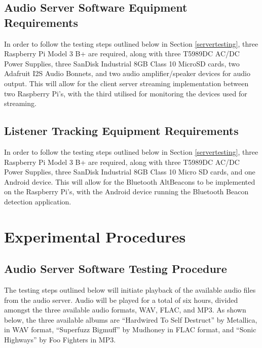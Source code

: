 \documentclass[11pt,a4paper,headinclude=false,footinclude=false]{scrreprt}
\begin{document}
\subsection{Audio Server Software Equipment
Requirements}\label{audio-server-software-equipment-requirements}

In order to follow the testing steps outlined below in Section
\ref{servertesting}, three Raspberry Pi Model 3 B+ are required, along
with three T5989DC AC/DC Power Supplies, three SanDisk Industrial 8GB
Class 10 MicroSD cards, two Adafruit I2S Audio Bonnets, and two audio
amplifier/speaker devices for audio output. This will allow for the
client server streaming implementation between two Raspberry Pi's, with
the third utilised for monitoring the devices used for streaming.

\subsection{Listener Tracking Equipment
Requirements}\label{listener-tracking-equipment-requirements}

In order to follow the testing steps outlined below in Section
\ref{servertesting}, three Raspberry Pi Model 3 B+ are required, along
with three T5989DC AC/DC Power Supplies, three SanDisk Industrial 8GB
Class 10 Micro SD cards, and one Android device. This will allow for the
Bluetooth AltBeacons to be implemented on the Raspberry Pi's, with the
Android device running the Bluetooth Beacon detection application.

\section{\texorpdfstring{Experimental Procedures
\label{expprocedure}}{Experimental Procedures }}\label{experimental-procedures}

\subsection{\texorpdfstring{Audio Server Software Testing Procedure
\label{servertesting}}{Audio Server Software Testing Procedure }}\label{audio-server-software-testing-procedure}

The testing steps outlined below will initiate playback of the available
audio files from the audio server. Audio will be played for a total of
six hours, divided amongst the three available audio formats, WAV, FLAC,
and MP3. As shown below, the three available albums are ``Hardwired To
Self Destruct'' by Metallica, in WAV format, ``Superfuzz Bigmuff'' by
Mudhoney in FLAC format, and ``Sonic Highways'' by Foo Fighters in MP3.
\end{document}
